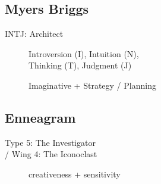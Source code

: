 \documentclass[10pt, a4paper, twocolumn]{article}
\begin{document}
\subsection*{Myers Briggs}
\begin{description}

 \item[INTJ: Architect]
 Introversion (I),
 Intuition (N), \\
 Thinking (T),
 Judgment (J)
 \item[] Imaginative + Strategy / Planning
\end{description}


 \subsection*{Enneagram}
 \begin{description}

  \item[Type 5: The Investigator] %
 \item[/ Wing 4: The Iconoclast] %
 \item[] creativeness + sensitivity
 \end{description}

\end{document}
